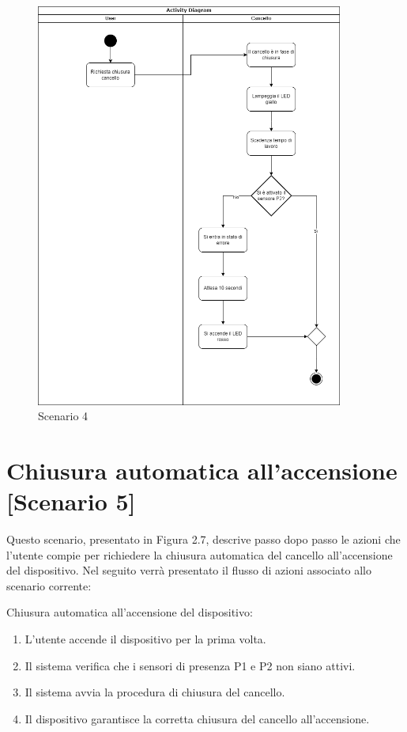 \begin{figure}[H]
    \centering
    \includegraphics[width=0.9\textwidth]{figures/scenario4.drawio.png}
    \caption{Scenario 4}
    \label{scenario4}
\end{figure}


\section{Chiusura automatica all'accensione [Scenario 5]}
Questo scenario, presentato in Figura 2.7, descrive passo dopo passo le azioni che l’utente compie per richiedere la chiusura automatica del cancello all'accensione del dispositivo. Nel seguito verrà presentato il flusso di azioni associato allo scenario corrente:

\noindent Chiusura automatica all'accensione del dispositivo:

\begin{enumerate}
\item L’utente accende il dispositivo per la prima volta.
\item Il sistema verifica che i sensori di presenza P1 e P2 non siano attivi.
\item Il sistema avvia la procedura di chiusura del cancello.
\item Il dispositivo garantisce la corretta chiusura del cancello all'accensione.
\end{enumerate}


